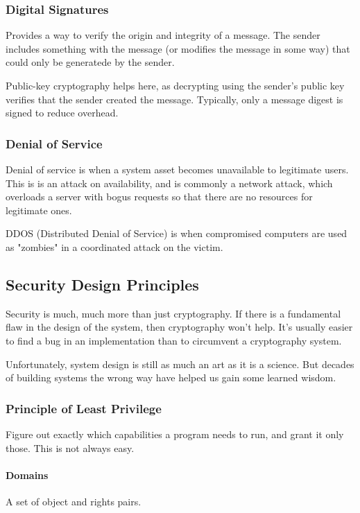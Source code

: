 \documentclass{article}
\begin{document}
\subsubsection{Digital Signatures}

Provides a way to verify the origin and integrity of a message. The sender includes something with the message (or modifies the message in some way) that could only be generatede by the sender.

Public-key cryptography helps here, as decrypting using the sender's public key verifies that the sender created the message. Typically, only a message digest is signed to reduce overhead.

\subsubsection{Denial of Service}

Denial of service is when a system asset becomes unavailable to legitimate users. This is is an attack on availability, and is commonly a network attack, which overloads a server with bogus requests so that there are no resources for legitimate ones.

DDOS (Distributed Denial of Service) is when compromised computers are used as "zombies" in a coordinated attack on the victim.

\subsection{Security Design Principles}

Security is much, much more than just cryptography. If there is a fundamental flaw in the design of the system, then cryptography won't help. It's usually easier to find a bug in an implementation than to circumvent a cryptography system.

Unfortunately, system design is still as much an art as it is a science. But decades of building systems the wrong way have helped us gain some learned wisdom.

\subsubsection{Principle of Least Privilege}

Figure out exactly which capabilities a program needs to run, and grant it only those. This is not always easy.

\paragraph{Domains} A set of object and rights pairs.
\end{document}
